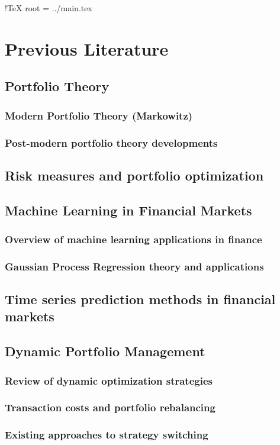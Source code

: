 !TeX root = ../main.tex

\chapter{Previous Literature}\label{chapter:previous literature}

\section{Portfolio Theory}

\subsection{Modern Portfolio Theory (Markowitz)}

\subsection{Post-modern portfolio theory developments}

\section{Risk measures and portfolio optimization}

\section{Machine Learning in Financial Markets}

\subsection{Overview of machine learning applications in finance}

\subsection{Gaussian Process Regression theory and applications}

\section{Time series prediction methods in financial markets}

\section{Dynamic Portfolio Management}

\subsection{Review of dynamic optimization strategies}

\subsection{Transaction costs and portfolio rebalancing}

\subsection{Existing approaches to strategy switching}


